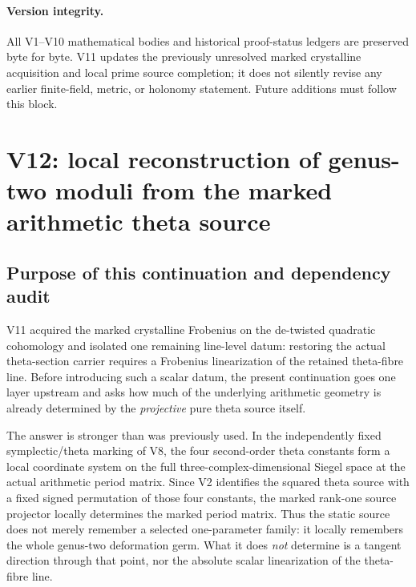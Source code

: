 \documentclass[11pt]{article}
\theoremstyle{definition}
\theoremstyle{remark}
\begin{document}
\paragraph{Version integrity.}
All V1--V10 mathematical bodies and historical proof-status ledgers are
preserved byte for byte. V11 updates the previously unresolved marked
crystalline acquisition and local prime source completion; it does not
silently revise any earlier finite-field, metric, or holonomy statement.
Future additions must follow this block.
\clearpage
\section{V12: local reconstruction of genus-two moduli from the marked arithmetic theta source}
\label{sec:v12-source-moduli}

\subsection{Purpose of this continuation and dependency audit}
V11 acquired the marked crystalline Frobenius on the de-twisted quadratic
cohomology and isolated one remaining line-level datum: restoring the actual
theta-section carrier requires a Frobenius linearization of the retained
theta-fibre line.  Before introducing such a scalar datum, the present
continuation goes one layer upstream and asks how much of the underlying
arithmetic geometry is already determined by the \emph{projective} pure theta
source itself.

The answer is stronger than was previously used.  In the independently fixed
symplectic/theta marking of V8, the four second-order theta constants form a
local coordinate system on the full three-complex-dimensional Siegel space at
the actual arithmetic period matrix.  Since V2 identifies the squared theta
source with a fixed signed permutation of those four constants, the marked
rank-one source projector locally determines the marked period matrix.  Thus
the static source does not merely remember a selected one-parameter family: it
locally remembers the whole genus-two deformation germ.  What it does \emph{not}
determine is a tangent direction through that point, nor the absolute scalar
linearization of the theta-fibre line.
\end{document}
